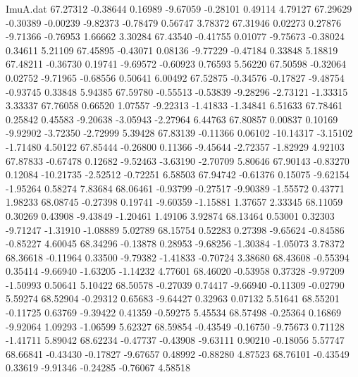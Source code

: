 \begin{filecontents}{ImuA.dat}
  67.27312   -0.38644    0.16989   -9.67059   -0.28101    0.49114    4.79127
  67.29629   -0.30389   -0.00239   -9.82373   -0.78479    0.56747    3.78372
  67.31946    0.02273    0.27876   -9.71366   -0.76953    1.66662    3.30284
  67.43540   -0.41755    0.01077   -9.75673   -0.38024    0.34611    5.21109
  67.45895   -0.43071    0.08136   -9.77229   -0.47184    0.33848    5.18819
  67.48211   -0.36730    0.19741   -9.69572   -0.60923    0.76593    5.56220
  67.50598   -0.32064    0.02752   -9.71965   -0.68556    0.50641    6.00492
  67.52875   -0.34576   -0.17827   -9.48754   -0.93745    0.33848    5.94385
  67.59780   -0.55513   -0.53839   -9.28296   -2.73121   -1.33315    3.33337
  67.76058    0.66520    1.07557   -9.22313   -1.41833   -1.34841    6.51633
  67.78461    0.25842    0.45583   -9.20638   -3.05943   -2.27964    6.44763
  67.80857    0.00837    0.10169   -9.92902   -3.72350   -2.72999    5.39428
  67.83139   -0.11366    0.06102  -10.14317   -3.15102   -1.71480    4.50122
  67.85444   -0.26800    0.11366   -9.45644   -2.72357   -1.82929    4.92103
  67.87833   -0.67478    0.12682   -9.52463   -3.63190   -2.70709    5.80646
  67.90143   -0.83270    0.12084  -10.21735   -2.52512   -0.72251    6.58503
  67.94742   -0.61376    0.15075   -9.62154   -1.95264    0.58274    7.83684
  68.06461   -0.93799   -0.27517   -9.90389   -1.55572    0.43771    1.98233
  68.08745   -0.27398    0.19741   -9.60359   -1.15881    1.37657    2.33345
  68.11059    0.30269    0.43908   -9.43849   -1.20461    1.49106    3.92874
  68.13464    0.53001    0.32303   -9.71247   -1.31910   -1.08889    5.02789
  68.15754    0.52283    0.27398   -9.65624   -0.84586   -0.85227    4.60045
  68.34296   -0.13878    0.28953   -9.68256   -1.30384   -1.05073    3.78372
  68.36618   -0.11964    0.33500   -9.79382   -1.41833   -0.70724    3.38680
  68.43608   -0.55394    0.35414   -9.66940   -1.63205   -1.14232    4.77601
  68.46020   -0.53958    0.37328   -9.97209   -1.50993    0.50641    5.10422
  68.50578   -0.27039    0.74417   -9.66940   -0.11309   -0.02790    5.59274
  68.52904   -0.29312    0.65683   -9.64427    0.32963    0.07132    5.51641
  68.55201   -0.11725    0.63769   -9.39422    0.41359   -0.59275    5.45534
  68.57498   -0.25364    0.16869   -9.92064    1.09293   -1.06599    5.62327
  68.59854   -0.43549   -0.16750   -9.75673    0.71128   -1.41711    5.89042
  68.62234   -0.47737   -0.43908   -9.63111    0.90210   -0.18056    5.57747
  68.66841   -0.43430   -0.17827   -9.67657    0.48992   -0.88280    4.87523
  68.76101   -0.43549    0.33619   -9.91346   -0.24285   -0.76067    4.58518

\end{filecontents}
